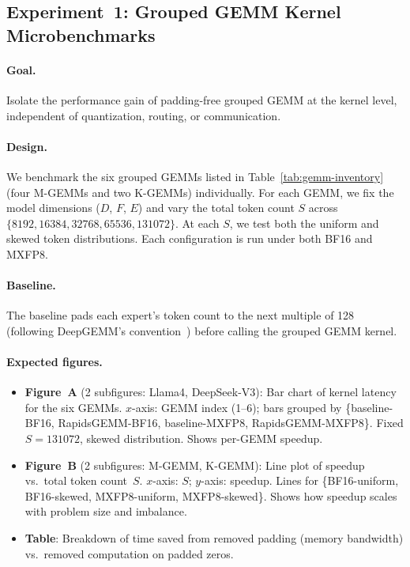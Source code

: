 \documentclass[11pt,a4paper]{article}
\theoremstyle{definition}
\begin{document}
\subsection{Experiment~1: Grouped GEMM Kernel Microbenchmarks}
\label{sec:exp-kernel}

\paragraph{Goal.}
Isolate the performance gain of padding-free grouped GEMM at the
kernel level, independent of quantization, routing, or communication.

\paragraph{Design.}
We benchmark the six grouped GEMMs listed in
Table~\ref{tab:gemm-inventory} (four M-GEMMs and two K-GEMMs)
individually.
For each GEMM, we fix the model dimensions ($D$, $F$, $E$) and
vary the total token count $S$ across
$\{8192, 16384, 32768, 65536, 131072\}$.
At each $S$, we test both the uniform and skewed token distributions.
Each configuration is run under both BF16 and MXFP8.

\paragraph{Baseline.}
The baseline pads each expert's token count to the next multiple
of 128 (following DeepGEMM's convention~\cite{deepgemm2025})
before calling the grouped GEMM kernel.

\paragraph{Expected figures.}
\begin{itemize}
  \item \textbf{Figure~A} (2 subfigures: Llama4, DeepSeek-V3):
    Bar chart of kernel latency for the six GEMMs.
    $x$-axis: GEMM index (1--6); bars grouped by
    \{baseline-BF16, RapidsGEMM-BF16, baseline-MXFP8,
    RapidsGEMM-MXFP8\}.
    Fixed $S = 131072$, skewed distribution.
    Shows per-GEMM speedup.
  \item \textbf{Figure~B} (2 subfigures: M-GEMM, K-GEMM):
    Line plot of speedup vs.\ total token count~$S$.
    $x$-axis: $S$; $y$-axis: speedup.
    Lines for \{BF16-uniform, BF16-skewed, MXFP8-uniform,
    MXFP8-skewed\}.
    Shows how speedup scales with problem size and imbalance.
  \item \textbf{Table}: Breakdown of time saved from removed padding
    (memory bandwidth) vs.\ removed computation on padded zeros.
\end{itemize}
\end{document}
